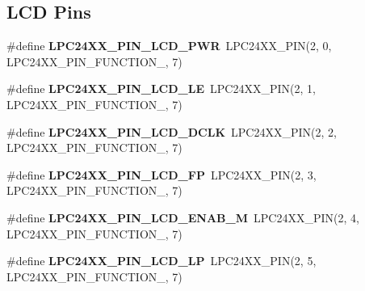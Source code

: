 \subsection*{L\+CD Pins}
\begin{DoxyCompactItemize}
\item 
\mbox{\label{group__lpc24xx__io_ga2ae974d2f1ff99d9cdc098882759e1e0}} 
\#define {\bfseries L\+P\+C24\+X\+X\+\_\+\+P\+I\+N\+\_\+\+L\+C\+D\+\_\+\+P\+WR}~L\+P\+C24\+X\+X\+\_\+\+P\+IN(2, 0, L\+P\+C24\+X\+X\+\_\+\+P\+I\+N\+\_\+\+F\+U\+N\+C\+T\+I\+O\+N\+\_, 7)
\item 
\mbox{\label{group__lpc24xx__io_gae3e57ad892a8111a7ae3d26d1785cbc0}} 
\#define {\bfseries L\+P\+C24\+X\+X\+\_\+\+P\+I\+N\+\_\+\+L\+C\+D\+\_\+\+LE}~L\+P\+C24\+X\+X\+\_\+\+P\+IN(2, 1, L\+P\+C24\+X\+X\+\_\+\+P\+I\+N\+\_\+\+F\+U\+N\+C\+T\+I\+O\+N\+\_, 7)
\item 
\mbox{\label{group__lpc24xx__io_ga02452d7766fe3833eef0a4bf86bb994f}} 
\#define {\bfseries L\+P\+C24\+X\+X\+\_\+\+P\+I\+N\+\_\+\+L\+C\+D\+\_\+\+D\+C\+LK}~L\+P\+C24\+X\+X\+\_\+\+P\+IN(2, 2, L\+P\+C24\+X\+X\+\_\+\+P\+I\+N\+\_\+\+F\+U\+N\+C\+T\+I\+O\+N\+\_, 7)
\item 
\mbox{\label{group__lpc24xx__io_gaa65afce42e732c3e01f2d73473eb3b04}} 
\#define {\bfseries L\+P\+C24\+X\+X\+\_\+\+P\+I\+N\+\_\+\+L\+C\+D\+\_\+\+FP}~L\+P\+C24\+X\+X\+\_\+\+P\+IN(2, 3, L\+P\+C24\+X\+X\+\_\+\+P\+I\+N\+\_\+\+F\+U\+N\+C\+T\+I\+O\+N\+\_, 7)
\item 
\mbox{\label{group__lpc24xx__io_gad611c29e3f07bf7b21cdcb811fe343ea}} 
\#define {\bfseries L\+P\+C24\+X\+X\+\_\+\+P\+I\+N\+\_\+\+L\+C\+D\+\_\+\+E\+N\+A\+B\+\_\+M}~L\+P\+C24\+X\+X\+\_\+\+P\+IN(2, 4, L\+P\+C24\+X\+X\+\_\+\+P\+I\+N\+\_\+\+F\+U\+N\+C\+T\+I\+O\+N\+\_, 7)
\item 
\mbox{\label{group__lpc24xx__io_ga2649cb9a3b2cbb5ca3d4e5ae1aecc5a5}} 
\#define {\bfseries L\+P\+C24\+X\+X\+\_\+\+P\+I\+N\+\_\+\+L\+C\+D\+\_\+\+LP}~L\+P\+C24\+X\+X\+\_\+\+P\+IN(2, 5, L\+P\+C24\+X\+X\+\_\+\+P\+I\+N\+\_\+\+F\+U\+N\+C\+T\+I\+O\+N\+\_, 7)
\item 
\mbox{\label{group__lpc24xx__io_gaccbed3400ff9d9008fa3229e884c0920}} 

\end{DoxyCompactItemize}
